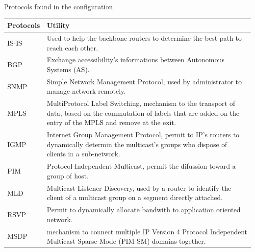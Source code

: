 \documentclass[usenames,dvipsnames]{beamer}
\begin{document}
\begin{frame}{\insertsection}

Protocols found in the configuration \\

{\footnotesize
\begin{tabular}{|l|p{10cm}|}
    \hline
    \textbf{Protocols} & \textbf{Utility} \\
    \hline
    IS-IS & Used to help the backbone routers to determine the best path to reach each other.\\
    \hline
    BGP & Exchange accessibility's informations between Autonomous Systems (AS).\\
    \hline
    SNMP & Simple Network Management Protocol, used by administrator to manage network remotely.\\
    \hline
    MPLS & MultiProtocol Label Switching, mechanism to the transport of data, based on the commutation of labels that are added on the entry of the MPLS and remove at the exit.  \\
    \hline
   IGMP & Internet Group Management Protocol, permit to IP's routers to dynamically determin the multicast's groups who dispose of clients in a sub-network.\\
    \hline
    PIM & Protocol-Independent Multicast,  permit the difussion toward a group of host. \\
    \hline
    MLD & Multicast Listener Discovery, used by a router to identify the client of a multicast group on a segment directly attached. \\
    \hline
    RSVP & Permit to dynamically allocate bandwith to application oriented network.\\
    \hline
    MSDP & mechanism to connect multiple IP Version 4 Protocol Independent Multicast Sparse-Mode (PIM-SM) domains together.\\
    \hline
\end{tabular}
}
\end{frame}
\end{document}
